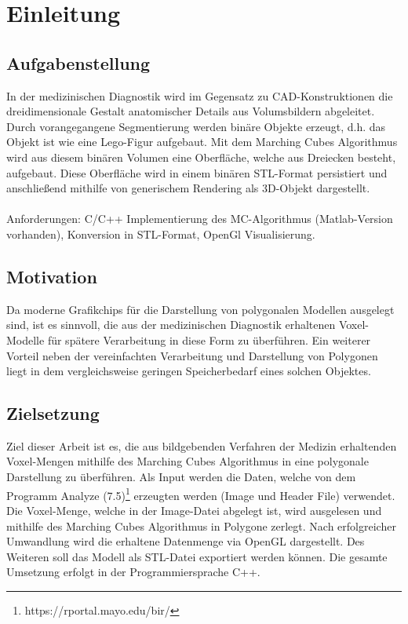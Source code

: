 \chapter{Einleitung}

\section{Aufgabenstellung}
In der medizinischen Diagnostik wird im Gegensatz zu CAD-Konstruktionen die dreidimensionale
Gestalt anatomischer Details aus Volumsbildern abgeleitet. Durch vorangegangene Segmentierung werden binäre Objekte erzeugt, d.h. das Objekt ist wie eine Lego-Figur aufgebaut. Mit dem Marching Cubes Algorithmus wird aus diesem binären Volumen eine Oberfläche, welche aus Dreiecken besteht, aufgebaut. Diese Oberfläche wird in einem binären STL-Format persistiert und anschließend mithilfe von generischem Rendering als 3D-Objekt dargestellt.\\\\
Anforderungen: C/C++ Implementierung des MC-Algorithmus (Matlab-Version vorhanden), Konversion in STL-Format, OpenGl Visualisierung.

\section{Motivation}
Da moderne Grafikchips für die Darstellung von polygonalen Modellen ausgelegt sind, ist es sinnvoll, die aus der medizinischen Diagnostik erhaltenen Voxel-Modelle für spätere Verarbeitung in diese Form zu überführen. Ein weiterer Vorteil neben der vereinfachten Verarbeitung und Darstellung von Polygonen liegt in dem vergleichsweise geringen Speicherbedarf eines solchen Objektes.

\section{Zielsetzung}
Ziel dieser Arbeit ist es, die aus bildgebenden Verfahren der Medizin erhaltenden Voxel-Mengen mithilfe des Marching Cubes Algorithmus in eine polygonale Darstellung zu überführen. Als Input werden die Daten, welche von dem Programm Analyze (7.5)\footnote{https://rportal.mayo.edu/bir/} erzeugten werden (Image und Header File) verwendet. Die Voxel-Menge, welche in der Image-Datei abgelegt ist, wird ausgelesen und mithilfe des Marching Cubes Algorithmus in Polygone zerlegt. Nach erfolgreicher Umwandlung wird die erhaltene Datenmenge via OpenGL dargestellt. Des Weiteren soll das Modell als STL-Datei exportiert werden können. Die gesamte Umsetzung erfolgt in der Programmiersprache C++. 
